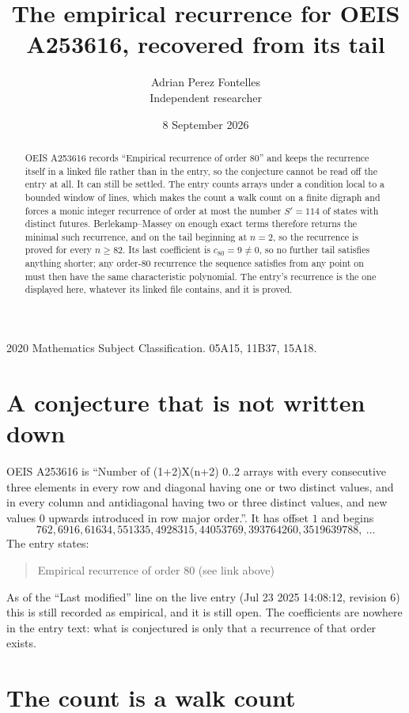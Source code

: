 \documentclass[11pt,a4paper]{article}
\title{The empirical recurrence for OEIS A253616, recovered from its tail}
\author{Adrian Perez Fontelles\\ \small Independent researcher}
\date{8 September 2026}
\theoremstyle{plain}
\theoremstyle{definition}
\begin{document}
\maketitle

\begin{abstract}
OEIS A253616 records ``Empirical recurrence of order $80$'' and keeps the recurrence itself in
a linked file rather than in the entry, so the conjecture cannot be read off the entry at all.
It can still be settled. The entry counts arrays under a condition local to a bounded window of
lines, which makes the count a walk count on a finite digraph and forces a monic integer
recurrence of order at most the number $S'=114$ of states with distinct futures. Berlekamp--Massey on
enough exact terms therefore returns the minimal such recurrence, and on the tail beginning at $n=2$, so the recurrence is proved for every $n\ge82$.
Its last coefficient is $c_{80}=9\neq0$, so no further tail satisfies anything
shorter; any order-$80$ recurrence the sequence satisfies from any point on must then have
the same characteristic polynomial. The entry's recurrence is the one displayed here, whatever
its linked file contains, and it is proved.
\end{abstract}

\noindent\small 2020 Mathematics Subject Classification. 05A15, 11B37, 15A18.\normalsize

\section{A conjecture that is not written down}

OEIS A253616 is ``Number of (1+2)X(n+2) 0..2 arrays with every consecutive three elements in every row and diagonal having one or two distinct values, and in every column and antidiagonal having two or three distinct values, and new values 0 upwards introduced in row major order.''. It has offset $1$ and begins
\[
762, 6916, 61634, 551335, 4928315, 44053769, 393764260, 3519639788,\ \dots
\]
The entry states:
\begin{quote}
Empirical recurrence of order 80 (see link above)
\end{quote}
As of the ``Last modified'' line on the live entry (Jul 23 2025 14:08:12, revision 6)
this is still recorded as empirical, and it is still open. The coefficients are nowhere in the
entry text: what is conjectured is only that a recurrence of that order exists.

\section{The count is a walk count}
\end{document}
